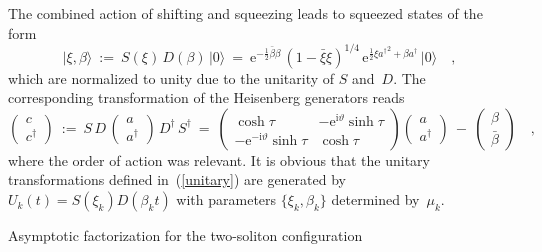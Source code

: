 \documentclass[a4paper,11pt]{article}
\makeatletter
\renewcommand{\section}{\@startsection{section}{1}{0pt}{\medskipamount}
{\medskipamount}{\large\bf}}
\numberwithin{equation}{section}
\def\b{\beta}
\def\e{\mbox{e}}
\def\i{\mbox{i}}
\newcommand{\adag}{a^{\dagger}}
\newcommand{\cdag}{c^{\dagger}}
\makeatother
\begin{document}
The combined action of shifting and squeezing leads to squeezed states
of the form
\begin{equation}
|\xi,\b\rangle\ :=\ S(\xi)\,D(\b)\,|0\rangle\ =\
\e^{-\frac12\bar\b\b}\,(1-\bar\xi\xi)^{1/4}\,\e^{\frac12\xi{\adag}^2+\b\adag}\,
|0\rangle \quad,
\end{equation}
which are normalized to unity due to the unitarity of $S$ and~$D$.
The corresponding transformation of the Heisenberg generators reads
\begin{equation}
\begin{pmatrix} c \\ \cdag \end{pmatrix}\ :=\ S\,D\,
\begin{pmatrix} a \\ \adag \end{pmatrix}\,D^\dagger\,S^\dagger\ =\
\begin{pmatrix}
\cosh\tau & -\e^{\i\vartheta}\sinh\tau \\
-\e^{-\i\vartheta}\sinh\tau & \cosh\tau \end{pmatrix}
\begin{pmatrix} a \\ \adag \end{pmatrix}\ -\
\begin{pmatrix} \b \\ \bar\b \end{pmatrix} \quad,
\end{equation}
where the order of action was relevant.
It is obvious that the unitary transformations defined in~(\ref{unitary})
are generated by $U_k(t)=S(\xi_k)D(\b_k t)$ with parameters $\{\xi_k,\b_k\}$
determined by~$\mu_k$.


\section{Asymptotic factorization for the two-soliton configuration}
\end{document}
